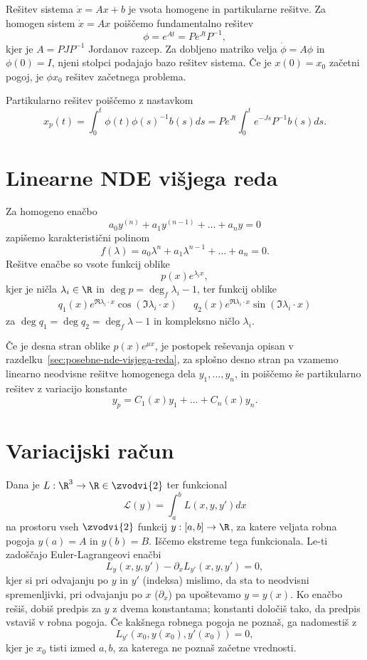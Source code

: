 Rešitev sistema $\dot{x} = A x + b$ je vsota homogene in partikularne rešitve.
Za homogen sistem $\dot{x} = Ax$ poiščemo fundamentalno rešitev
\[
  \phi = e^{A t} = P e^{Jt} P^{-1},
\]
kjer je $A=PJP^{-1}$ Jordanov razcep.
Za dobljeno matriko velja $\dot{\phi} = A \phi$ in $\phi(0) = I$, njeni stolpci
podajajo bazo rešitev sistema.
Če je $x(0) = x_0$ začetni pogoj, je $\phi x_0$ rešitev začetnega problema.

Partikularno rešitev poiščemo z nastavkom
\[
  x_p(t) = \int_0^t \phi(t) \phi(s)^{-1} b(s) ds
  = P e^{Jt} \int_0^t e^{-Js} P^{-1} b(s) ds.
\]

\section{Linearne NDE višjega reda}%
\label{sec:linearne-nde-visjega-reda}

Za homogeno enačbo
\[
  a_0 y^{(n)} + a_1 y^{(n-1)} + \ldots + a_n y = 0
\]
zapišemo karakteristični polinom
\[
  f(\lambda) = a_0 \lambda^n + a_1 \lambda^{n-1} + \ldots + a_n = 0.
\]
Rešitve enačbe so vsote funkcij oblike
\[
  p(x) e^{\lambda_i x},
\]
kjer je ničla $\lambda_i \in \R$ in $\deg p = \deg_f \lambda_i - 1$, ter
funkcij oblike
\begin{align*}
  q_1(x) e^{\Re \lambda_i \cdot x} \cos(\Im \lambda_i \cdot x)
  && q_2(x) e^{\Re \lambda_i \cdot x} \sin(\Im \lambda_i \cdot x)
\end{align*}
za $\deg q_1 = \deg q_2 = \deg_f \lambda - 1$ in kompleksno ničlo $\lambda_i$.

Če je desna stran oblike $p(x) e^{\mu x}$, je postopek reševanja opisan v
razdelku~\ref{sec:posebne-nde-visjega-reda}, za splošno desno stran pa vzamemo
linearno neodvisne rešitve homogenega dela $y_1, \ldots, y_n$, in poiščemo še
partikularno rešitev z variacijo konstante
\[
  y_p = C_1(x) y_1 + \ldots + C_n(x) y_n.
\]

\section{Variacijski račun}%
\label{sec:variacijski-racun}

Dana je $L: \R^3 \to \R \in \zvodvi{2}$ ter funkcional
\[
  \mathcal{L}(y) = \int_a^b L(x, y, y') dx
\]
na prostoru vseh $\zvodvi{2}$ funkcij $y: [a, b] \to \R$, za katere veljata
robna pogoja $y(a) = A$ in $y(b) = B$.
Iščemo ekstreme tega funkcionala.
Le-ti zadoščajo Euler-Lagrangeovi enačbi
\[
  L_y(x, y, y') - \partial_x L_{y'}(x, y, y') = 0,
\]
kjer si pri odvajanju po $y$ in $y'$ (indeksa) mislimo, da sta to neodvisni
spremenljivki, pri odvajanju po $x$ ($\partial_x$) pa upoštevamo $y = y(x)$.
Ko enačbo rešiš, dobiš predpis za $y$ z dvema konstantama; konstanti določiš
tako, da predpis vstaviš v robna pogoja.
Če kakšnega robnega pogoja ne poznaš, ga nadomestiš z
\[
  L_{y'}(x_0, y(x_0), y'(x_0)) = 0,
\]
kjer je $x_0$ tisti izmed $a, b$, za katerega ne poznaš začetne vrednosti.

